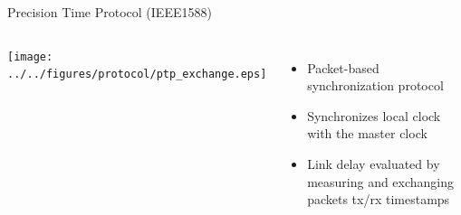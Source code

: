 \documentclass[compress,red]{beamer}
\begin{document}
\begin{frame}{Precision Time Protocol (IEEE1588)}

\begin{columns}[c]
  \column{1.5in}
      \begin{center}
	\texttt{[image: ../../figures/protocol/ptp\_exchange.eps]}
      \end{center}
  \column{2.5in}
      \begin{itemize}
	  \item Packet-based synchronization protocol
	  \item Synchronizes local clock with the master clock
	  \item Link delay evaluated by measuring and exchanging packets tx/rx timestamps
      \end{itemize}
  \end{columns}
\end{frame}
\end{document}
